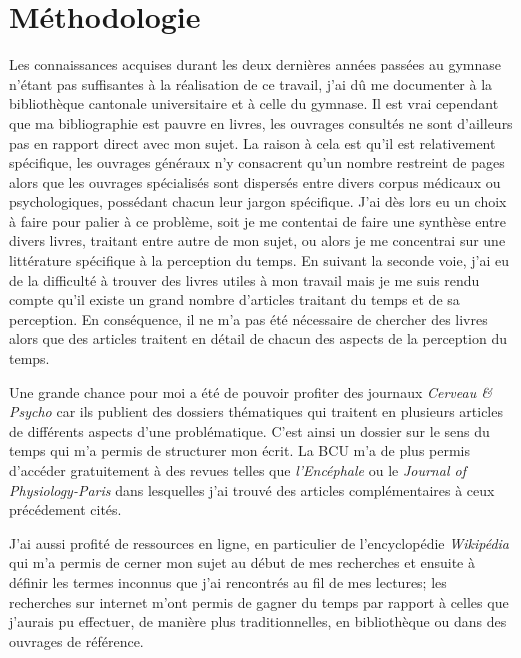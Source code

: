 \documentclass[12pt,fleqn,oneside,openany]{book} %
\begin{document}
\section{Méthodologie} \label{sec:methodologie}
Les connaissances acquises durant les deux dernières années passées au gymnase n'étant pas suffisantes à la réalisation de ce travail, j'ai dû me documenter à la bibliothèque cantonale universitaire et à celle du gymnase. Il est vrai cependant que ma bibliographie est pauvre en livres, les ouvrages consultés ne sont d'ailleurs pas en rapport direct avec mon sujet. La raison à cela est qu'il est relativement spécifique, les ouvrages généraux n'y consacrent qu'un nombre restreint de pages alors que les ouvrages spécialisés sont dispersés entre divers corpus médicaux ou psychologiques, possédant chacun leur jargon spécifique. J'ai dès lors eu un choix à faire pour palier à ce problème, soit je me contentai de faire une synthèse entre divers livres, traitant entre autre de mon sujet, ou alors je me concentrai sur une littérature spécifique à la perception du temps. En suivant la seconde voie, j'ai eu de la difficulté à trouver des livres utiles à mon travail mais je me suis rendu compte qu'il existe un grand nombre d'articles traitant du temps et de sa perception. En conséquence, il ne m'a pas été nécessaire de chercher des livres alors que des articles traitent en détail de chacun des aspects de la perception du temps.

Une grande chance pour moi a été de pouvoir profiter des journaux \emph{Cerveau \& Psycho} car ils publient des dossiers thématiques qui traitent en plusieurs articles de différents aspects d'une problématique. C'est ainsi un dossier sur le sens du temps qui m'a permis de structurer mon écrit. 
La BCU m'a de plus permis d'accéder gratuitement à des revues telles que \emph{l'Encéphale} ou le \emph{Journal of Physiology-Paris} dans lesquelles j'ai trouvé des articles complémentaires à ceux précédement cités. 

J'ai aussi profité de ressources en ligne, en particulier de l'encyclopédie \textit{Wikipédia} qui m'a permis de cerner mon sujet au début de mes recherches et ensuite à définir les termes inconnus que j'ai rencontrés au fil de mes lectures; les recherches sur internet m'ont permis de gagner du temps par rapport à celles que j'aurais pu effectuer, de manière plus traditionnelles, en bibliothèque ou dans des ouvrages de référence.
\end{document}
